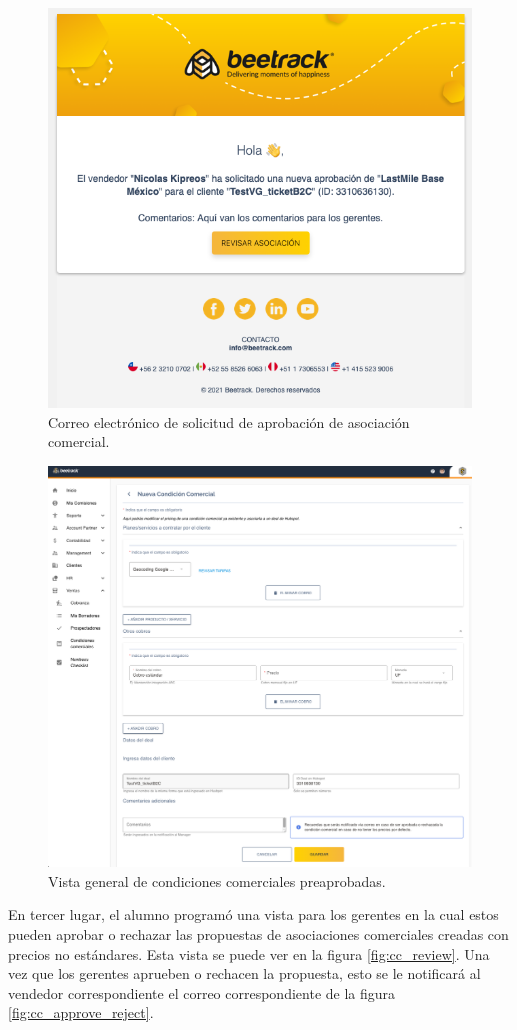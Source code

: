     \begin{figure}[H]
      \centering
      \includegraphics[width=0.6\linewidth]{figures/cc/mails/cc_mail_new.png}
      \caption{Correo electrónico de solicitud de aprobación de asociación comercial.}
      \label{fig:cc_mail_new}
    \end{figure}

    \begin{figure}[H]
      \centering
      \includegraphics[width=0.6\linewidth]{figures/cc/vistas/cc_new_sales_man.png}
      \caption{Vista general de condiciones comerciales preaprobadas.}
      \label{fig:cc_new_sales_man}
    \end{figure}

    En tercer lugar, el alumno programó una vista para los gerentes en la cual estos pueden aprobar o rechazar las propuestas de asociaciones comerciales creadas con precios no estándares. Esta vista se puede ver en la figura \ref{fig:cc_review}. Una vez que los gerentes aprueben o rechacen la propuesta, esto se le notificará al vendedor correspondiente el correo correspondiente de la figura \ref{fig:cc_approve_reject}.

